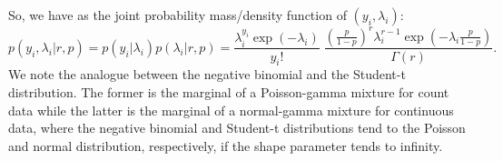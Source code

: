 \documentclass[11pt]{article}
\begin{document}

So, we have as the joint probability mass/density function of $(y_i, \lambda_i)$:
\begin{equation}\label{augmented_pmf_pdf}
p(y_i, \lambda_i|r,p) =  p(y_i|\lambda_i) p(\lambda_i|r,p) = 
\frac{\lambda_i^{y_i} \exp(-\lambda_i)}{y_i!}  \; 
\frac{\left(\frac{p}{1-p}\right)^{r} \lambda_i^{r-1} \exp \left(-\lambda_i  \frac{p}{1-p}\right)}{\Gamma(r)}.
\end{equation}
We note the analogue between the negative binomial and the Student-t distribution. The former is  the marginal of a Poisson-gamma mixture for count data while the latter is the marginal of a normal-gamma mixture for continuous data, where the negative binomial and Student-t distributions tend to
the Poisson and normal distribution, respectively, if the shape parameter tends to infinity.  
\end{document}
